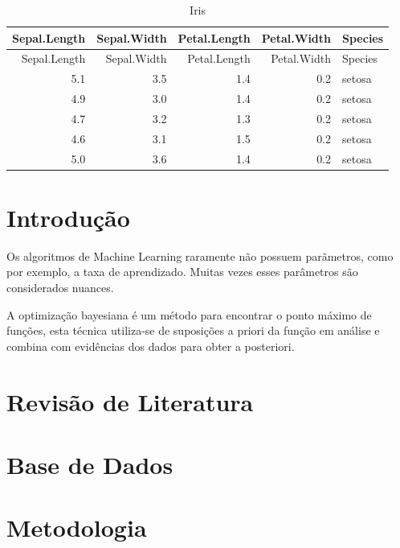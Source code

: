 \documentclass[
	12pt,				%
	a4paper,		%
	oneside,    %
	chapter=TITLE,		   %
	section=TITLE,		   %
	subsection=TITLE,	   %
	subsubsection=TITLE, %
	english,			%
	french,				%
	spanish,			%
	brazil,				%
]{abntex2}
\begin{document}

\tableofcontents*
\clearpage

\textual
\pagestyle{plain}

\begin{longtable}[]{@{}rrrrl@{}}
\caption{Iris}\tabularnewline
\toprule
Sepal.Length & Sepal.Width & Petal.Length & Petal.Width &
Species\tabularnewline
\midrule
\endfirsthead
\toprule
Sepal.Length & Sepal.Width & Petal.Length & Petal.Width &
Species\tabularnewline
\midrule
\endhead
5.1 & 3.5 & 1.4 & 0.2 & setosa\tabularnewline
4.9 & 3.0 & 1.4 & 0.2 & setosa\tabularnewline
4.7 & 3.2 & 1.3 & 0.2 & setosa\tabularnewline
4.6 & 3.1 & 1.5 & 0.2 & setosa\tabularnewline
5.0 & 3.6 & 1.4 & 0.2 & setosa\tabularnewline
\bottomrule
\end{longtable}

\hypertarget{introduuxe7uxe3o}{%
\chapter{Introdução}\label{introduuxe7uxe3o}}

Os algoritmos de Machine Learning raramente não possuem parãmetros, como
por exemplo, a taxa de aprendizado. Muitas vezes esses parâmetros são
considerados nuances.

A optimização bayesiana é um método para encontrar o ponto máximo de
funções, esta técnica utiliza-se de suposições a priori da função em
análise e combina com evidências dos dados para obter a posteriori. ~

\hypertarget{revisuxe3o-de-literatura}{%
\chapter{Revisão de Literatura}\label{revisuxe3o-de-literatura}}

\hypertarget{base-de-dados}{%
\chapter{Base de Dados}\label{base-de-dados}}

\hypertarget{metodologia}{%
\chapter{Metodologia}\label{metodologia}}
\end{document}
